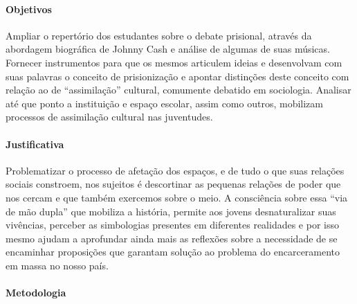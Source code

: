 \documentclass[11pt]{extarticle}
\begin{document}
\paragraph{Objetivos} Ampliar o repertório dos estudantes sobre o debate
prisional, através da abordagem biográfica de Johnny Cash e análise de
algumas de suas músicas. Fornecer instrumentos para que os mesmos
articulem ideias e desenvolvam com suas palavras o conceito de
prisionização e apontar distinções deste conceito com relação ao de
``assimilação'' cultural, comumente debatido em sociologia. Analisar até
que ponto a instituição e espaço escolar, assim como outros, mobilizam
processos de assimilação cultural nas juventudes.

\paragraph{Justificativa} Problematizar o processo de afetação dos
espaços, e de tudo o que suas relações sociais constroem, nos sujeitos é
descortinar as pequenas relações de poder que nos cercam e que também
exercemos sobre o meio. A consciência sobre essa ``via de mão dupla''
que mobiliza a história, permite aos jovens desnaturalizar suas
vivências, perceber as simbologias presentes em diferentes realidades e
por isso mesmo ajudam a aprofundar ainda mais as reflexões sobre a
necessidade de se encaminhar proposições que garantam solução ao
problema do encarceramento em massa no nosso país.

\paragraph{Metodologia} 
\end{document}
